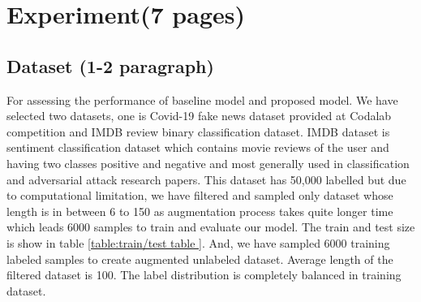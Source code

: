 \documentclass[%
	BCOR=8mm, %
	DIV=12, 
	toc=bibliography, %
	toc=listof, %
	oneside, %
	egregdoesnotlikesansseriftitles, %
	]{scrbook}
\begin{document}
\chapter{Experiment(7 pages)}

\section{Dataset (1-2 paragraph)}
For assessing the performance of baseline model and proposed model. We have selected two datasets, one is Covid-19 fake news  dataset provided at Codalab competition and IMDB review binary classification dataset. 
IMDB dataset is sentiment classification dataset which contains movie reviews of the user and having two classes positive and negative and most generally used in classification and adversarial attack research papers. This dataset has 50,000 labelled but due to computational limitation, we have filtered and sampled only dataset whose length is in between 6 to 150 as augmentation process takes quite longer time which leads  6000 samples to train and evaluate our model. The train and test size is show in table \ref{table:train/test table }. And, we have sampled 6000 training labeled samples to create augmented unlabeled dataset.  Average length of the filtered dataset is 100.  
The label distribution is completely balanced in training dataset. 
\end{document}
